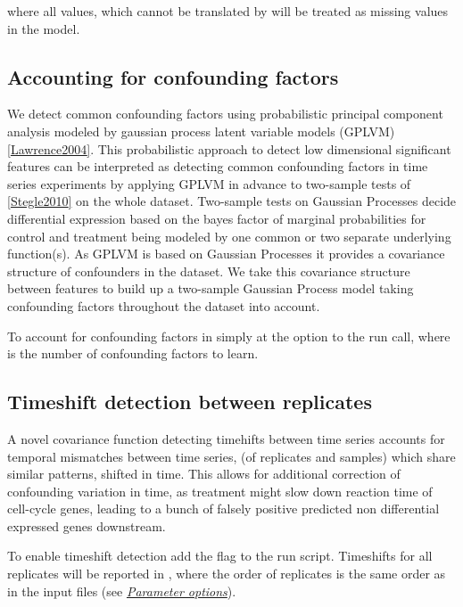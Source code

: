 \documentclass[letterpaper,10pt,english]{sphinxmanual}
\begin{document}
where all values, which cannot be translated by  will be
treated as missing values in the model.


\subsection{Accounting for confounding factors}
\label{confounders:accounting-for-confounding-factors}\label{confounders::doc}\label{confounders:confounders}
We detect common confounding factors using probabilistic principal component
analysis modeled by gaussian process latent variable models (GPLVM)
{\hyperref[confounders:lawrence2004]{{[}Lawrence2004{]}}}. This probabilistic approach to detect low
dimensional significant features can be interpreted as detecting
common confounding factors in time series experiments by applying
GPLVM in advance to two-sample tests of {\hyperref[confounders:stegle2010]{{[}Stegle2010{]}}} on the
whole dataset. Two-sample tests on Gaussian Processes decide
differential expression based on the bayes factor of marginal probabilities
for control and treatment being modeled by one common or two separate
underlying function(s). As GPLVM is based on Gaussian Processes it
provides a covariance structure of confounders in the dataset. We take
this covariance structure between features to build up a two-sample
Gaussian Process model taking confounding factors throughout the
dataset into account.

To account for confounding factors in  simply at the
option  to the run call, where  is the number of
confounding factors to learn.


\subsection{Timeshift detection between replicates}
\label{timeshift:timeshift}\label{timeshift::doc}\label{timeshift:timeshift-detection-between-replicates}
A novel covariance function detecting timehifts between
time series accounts for temporal mismatches between time series, (of
replicates and samples) which share similar patterns, shifted in
time. This allows for additional correction of confounding variation
in time, as treatment might slow down reaction time of cell-cycle
genes, leading to a bunch of falsely positive predicted non differential
expressed genes downstream.

To enable timeshift detection add the flag  to the run
script. Timeshifts for all replicates will be reported in
, where the order of replicates is the same order as in
the input files  (see {\hyperref[usage:usage]{\emph{Parameter options}}}).
\end{document}

